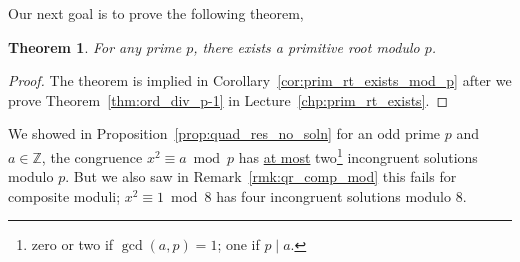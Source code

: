 \documentclass{amsbook}
\theoremstyle{plain}
\newtheorem{theorem}{Theorem}[chapter] %
\theoremstyle{definition}
\theoremstyle{remark}
\numberwithin{equation}{chapter}
\numberwithin{figure}{chapter}
\newcommand{\Z}{\mathbb{Z}}
\begin{document}
Our next goal is to prove the following theorem,
\begin{theorem}
  For any prime $p$, there exists a primitive root modulo $p$.
\end{theorem}
\begin{proof}
  The theorem is implied in Corollary~\ref{cor:prim_rt_exists_mod_p} after we prove Theorem~\ref{thm:ord_div_p-1} in Lecture~\ref{chp:prim_rt_exists}.
  \end{proof}

We showed in Proposition~\ref{prop:quad_res_no_soln} for an odd prime $p$ and $a \in \Z$, the congruence $x^2 \equiv a \bmod p$ has \underline{at most} two\footnote{zero or two if $\gcd (a, p) = 1$; one if $p \mid a$.} incongruent solutions modulo $p$. But we also saw in Remark~\ref{rmk:qr_comp_mod} this fails for composite moduli; $x^2 \equiv 1 \bmod 8$ has four incongruent solutions modulo $8$.
\end{document}
